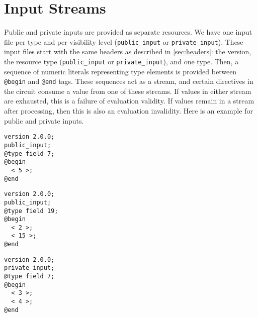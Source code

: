 \section{Input Streams}
\label{sec:streams}

Public and private inputs are provided as separate resources. 
We have one input file per type and per visibility level (\texttt{public\_input} or \texttt{private\_input}).
These input files start with the same headers as described in \cref{sec:headers}: the version, the resource type (\texttt{public\_input} or \texttt{private\_input}), and one type.
Then, a sequence of numeric literals representing type elements is provided between \texttt{@begin} and \texttt{@end} tags.
These sequences act as a stream, and certain directives in the circuit consume a value from one of these streams.
If values in either stream are exhausted, this is a failure of evaluation validity.
If values remain in a stream after processing, then this is also an evaluation invalidity.
Here is an example for public and private inputs. 

\begin{lstlisting}[language=ir]
version 2.0.0;
public_input;
@type field 7;
@begin
  < 5 >;
@end
\end{lstlisting}
%
\begin{lstlisting}[language=ir]
version 2.0.0;
public_input;
@type field 19;
@begin
  < 2 >;
  < 15 >;
@end
\end{lstlisting}
%
\begin{lstlisting}[language=ir]
version 2.0.0;
private_input;
@type field 7;
@begin
  < 3 >;
  < 4 >;
@end
\end{lstlisting}
